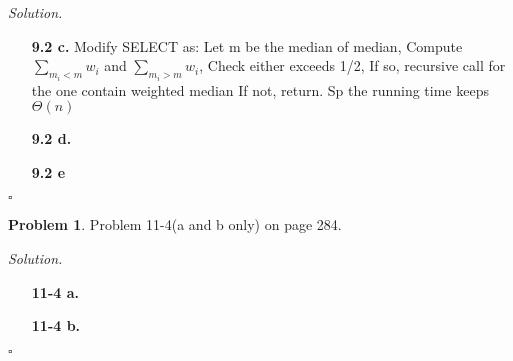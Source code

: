 \documentclass[11pt]{article}
\theoremstyle{definition}
\newtheorem{problem}{Problem}
\newenvironment{solution}{\noindent\emph{Solution.}}{\hfill$\square$}
\begin{document}
\begin{solution}
  \begin{enumerate}
  
    \item[\textbf{9.2 c.}]
Modify SELECT as:
Let m be the median of median,
Compute $\sum_{m_i < m} w_i$ and $ \sum_{m_i > m} w_i $,
Check either exceeds 1/2,
If so, recursive call for the one contain weighted median
If not, return.
Sp the running time keeps 
$\Theta(n)$

   \item[\textbf{9.2 d.}]
   
   
   \item[\textbf{9.2 e}]


    
    
  \end{enumerate}
\end{solution}

\newpage



\begin{problem}
Problem 11-4(a and b only) on page 284. 
\end{problem}

\begin{solution}
\begin{enumerate}
   \item[\textbf{11-4 a.}]
   
      \item[\textbf{11-4 b.}]



\end{enumerate}



\end{solution}
\end{document}
